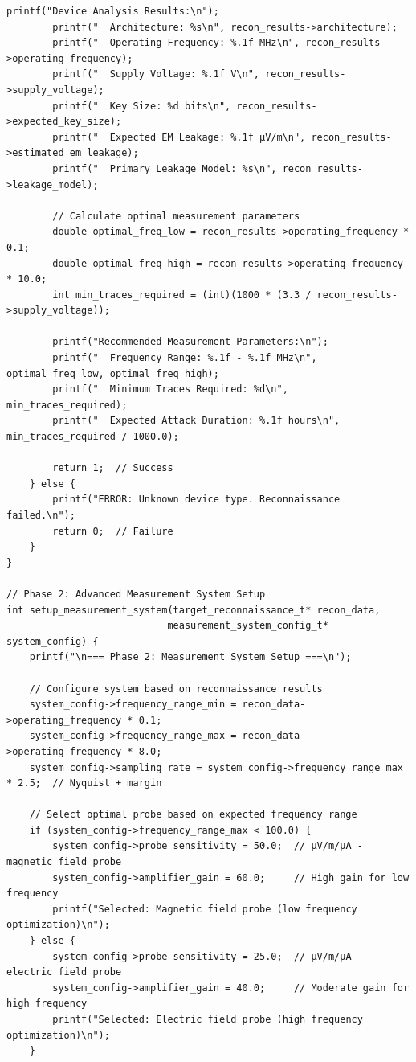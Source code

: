 \documentclass[11pt,a4paper]{article}
\theoremstyle{definition}
\begin{document}
\begin{lstlisting}[caption={Complete EM Attack Methodology Framework Implementation}]
        printf("Device Analysis Results:\n");
        printf("  Architecture: %s\n", recon_results->architecture);
        printf("  Operating Frequency: %.1f MHz\n", recon_results->operating_frequency);
        printf("  Supply Voltage: %.1f V\n", recon_results->supply_voltage);
        printf("  Key Size: %d bits\n", recon_results->expected_key_size);
        printf("  Expected EM Leakage: %.1f μV/m\n", recon_results->estimated_em_leakage);
        printf("  Primary Leakage Model: %s\n", recon_results->leakage_model);
        
        // Calculate optimal measurement parameters
        double optimal_freq_low = recon_results->operating_frequency * 0.1;
        double optimal_freq_high = recon_results->operating_frequency * 10.0;
        int min_traces_required = (int)(1000 * (3.3 / recon_results->supply_voltage));
        
        printf("Recommended Measurement Parameters:\n");
        printf("  Frequency Range: %.1f - %.1f MHz\n", optimal_freq_low, optimal_freq_high);
        printf("  Minimum Traces Required: %d\n", min_traces_required);
        printf("  Expected Attack Duration: %.1f hours\n", min_traces_required / 1000.0);
        
        return 1;  // Success
    } else {
        printf("ERROR: Unknown device type. Reconnaissance failed.\n");
        return 0;  // Failure
    }
}

// Phase 2: Advanced Measurement System Setup
int setup_measurement_system(target_reconnaissance_t* recon_data,
                            measurement_system_config_t* system_config) {
    printf("\n=== Phase 2: Measurement System Setup ===\n");
    
    // Configure system based on reconnaissance results
    system_config->frequency_range_min = recon_data->operating_frequency * 0.1;
    system_config->frequency_range_max = recon_data->operating_frequency * 8.0;
    system_config->sampling_rate = system_config->frequency_range_max * 2.5;  // Nyquist + margin
    
    // Select optimal probe based on expected frequency range
    if (system_config->frequency_range_max < 100.0) {
        system_config->probe_sensitivity = 50.0;  // μV/m/μA - magnetic field probe
        system_config->amplifier_gain = 60.0;     // High gain for low frequency
        printf("Selected: Magnetic field probe (low frequency optimization)\n");
    } else {
        system_config->probe_sensitivity = 25.0;  // μV/m/μA - electric field probe  
        system_config->amplifier_gain = 40.0;     // Moderate gain for high frequency
        printf("Selected: Electric field probe (high frequency optimization)\n");
    }
    

\end{lstlisting}
\end{document}
